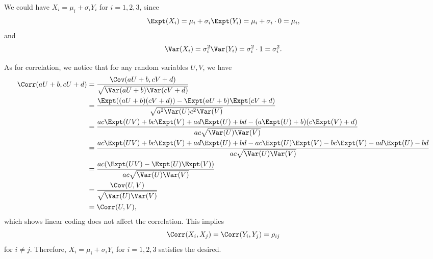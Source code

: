 We could have \(X_i = \mu_{i} + \sigma_{i} Y_i\) for \(i = 1, 2, 3\), since
\[
    \Expt(X_i) = \mu_{i} + \sigma_{i} \Expt(Y_i) = \mu_{i} + \sigma_{i} \cdot 0 = \mu_{i},
\]
and
\[
    \Var(X_i) = \sigma^2_{i} \Var(Y_i) = \sigma^2_{i} \cdot 1 = \sigma^2_{i}.
\]

As for correlation, we notice that for any random variables \(U, V\), we have
\begin{align*}
    \Corr(aU + b, cU + d) & = \frac{\Cov(aU + b, cV + d)}{\sqrt{\Var(aU + b) \Var(cV + d)}}                                                                  \\
                          & = \frac{\Expt((aU+b)(cV+d)) - \Expt(aU+b)\Expt(cV+d)}{\sqrt{a^2 \Var(U) c^2 \Var(V)}}                                            \\
                          & = \frac{ac\Expt(UV) + bc\Expt(V) + ad\Expt(U) + bd - (a\Expt(U) + b)(c\Expt(V) + d)}{ac\sqrt{\Var(U)\Var(V)}}                    \\
                          & = \frac{ac\Expt(UV) + bc\Expt(V) + ad\Expt(U) + bd - ac\Expt(U)\Expt(V) - bc\Expt(V) - ad\Expt(U) - bd}{ac\sqrt{\Var(U)\Var(V)}} \\
                          & = \frac{ac (\Expt(UV) - \Expt(U)\Expt(V))}{ac\sqrt{\Var(U) \Var(V)}}                                                             \\
                          & = \frac{\Cov(U, V)}{\sqrt{\Var(U) \Var(V)}}                                                                                      \\
                          & = \Corr(U, V),
\end{align*}
which shows linear coding does not affect the correlation. This implies
\[
    \Corr(X_i, X_j) = \Corr(Y_i, Y_j) = \rho_{ij}
\]
for \(i \neq j\). Therefore, \(X_i = \mu_{i} + \sigma_{i} Y_i\) for \(i = 1, 2, 3\) satisfies the desired.